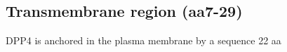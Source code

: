 \subsection{Transmembrane region (aa7-29)}

DPP4 is anchored in the plasma membrane by a sequence  22 aa